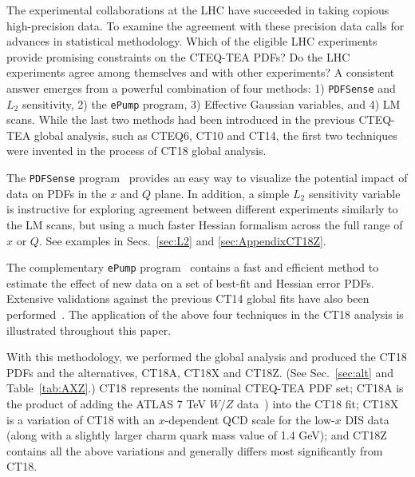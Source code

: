 The experimental collaborations at the LHC have succeeded in taking copious high-precision data. To examine
the agreement with these precision data calls for advances in statistical methodology. 
Which of the eligible LHC experiments provide promising constraints on the CTEQ-TEA PDFs?
Do the LHC experiments agree among themselves and with other experiments?
A consistent answer emerges from a powerful combination of four methods:
1) \texttt{PDFSense} and $L_2$ sensitivity,
2) the \texttt{ePump} program, 
3) Effective Gaussian variables,
and 4) LM scans.
While the last two methods had been introduced in the previous CTEQ-TEA global analysis, such as CTEQ6, CT10 and CT14, the first two techniques were invented in the process of CT18 global analysis. 

The \texttt{PDFSense} program~\cite{Wang:2018heo} provides an easy way to visualize the potential impact of data on PDFs in the $x$ and $Q$ plane. In addition, a simple $L_2$ sensitivity variable \cite{Hobbs:2019gob} is instructive for exploring agreement between different experiments similarly to the LM scans, but using a much faster Hessian formalism across the full range of $x$ or $Q$. See examples in Secs.~\ref{sec:L2} and \ref{sec:AppendixCT18Z}. 

The complementary \texttt{ePump} program~\cite{Schmidt:2018hvu} contains a fast and efficient method to estimate the effect of new data on a set of best-fit and Hessian error PDFs. Extensive validations against the previous CT14 global fits have also been performed~\cite{Hou:2019gfw}.
The application of the above four techniques in the CT18 analysis is illustrated throughout this paper. 

With this methodology, we performed the global analysis and produced the CT18 PDFs and the alternatives, CT18A, CT18X and CT18Z.
(See Sec.~\ref{sec:alt} and Table~\ref{tab:AXZ}.) CT18 represents the nominal CTEQ-TEA PDF set; CT18A is the product of adding the ATLAS 7 TeV $W/Z$ data~\cite{Aaboud:2016btc})
into the CT18 fit; CT18X is a variation of CT18 with an $x$-dependent QCD scale for the low-$x$ DIS data (along with a slightly larger charm quark mass value of 1.4 GeV);
and CT18Z contains all the above variations and generally differs most significantly from CT18. 


